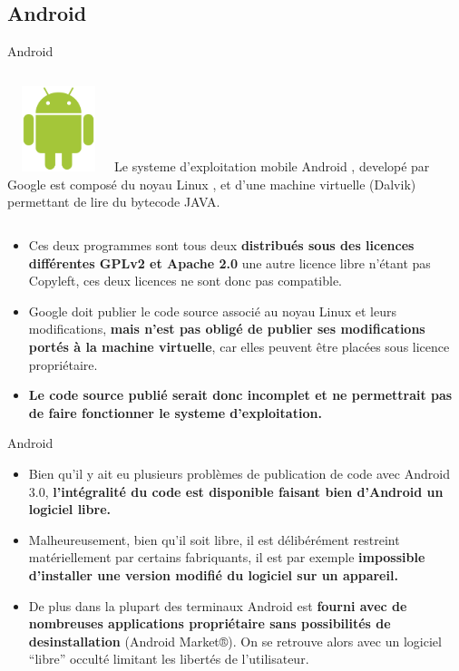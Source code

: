 \subsection{Android}
\begin{frame}[t,fragile]{Android}
    \fontsize{8}{11}\selectfont
        \begin{columns}
                \centering \includegraphics[height=2.5cm, width=3cm]{android-logo}
    Le systeme d’exploitation mobile Android , developé par Google est composé du noyau Linux , et d’une machine virtuelle (Dalvik) permettant de lire du bytecode JAVA.\pause
        \end{columns}
        \begin{itemize}
            \item Ces deux programmes sont tous deux \textbf{distribués sous des licences différentes GPLv2 et Apache 2.0} une autre licence libre n'étant pas Copyleft, ces deux licences ne sont donc pas compatible. \pause
            \item Google doit publier le code source associé au noyau Linux et leurs modifications, \textbf{mais n’est pas obligé de publier ses modifications portés à la machine virtuelle}, car elles peuvent être placées sous licence propriétaire.\pause
            \item \textbf{Le code source publié serait donc incomplet et ne permettrait pas de faire fonctionner le systeme d’exploitation.}
    \end{itemize}
\end{frame}


\begin{frame}[t,fragile]{Android}
    \fontsize{9}{11}\selectfont
    \begin{itemize}
        \item Bien qu’il y ait eu plusieurs problèmes de publication de code avec Android 3.0, \textbf{l'intégralité du code est disponible faisant bien d’Android un logiciel libre.} \pause
        \item Malheureusement, bien qu’il soit libre, il est délibérément restreint matériellement par certains fabriquants, il est par exemple \textbf{impossible d’installer une version modifié du logiciel sur un appareil.} \pause 
        \item De plus dans la plupart des terminaux Android est \textbf{fourni avec de nombreuses applications propriétaire sans possibilités de desinstallation} (Android Market®). On se retrouve alors avec un logiciel “libre” occulté limitant les libertés de l’utilisateur.
    \end{itemize}
\end{frame}


